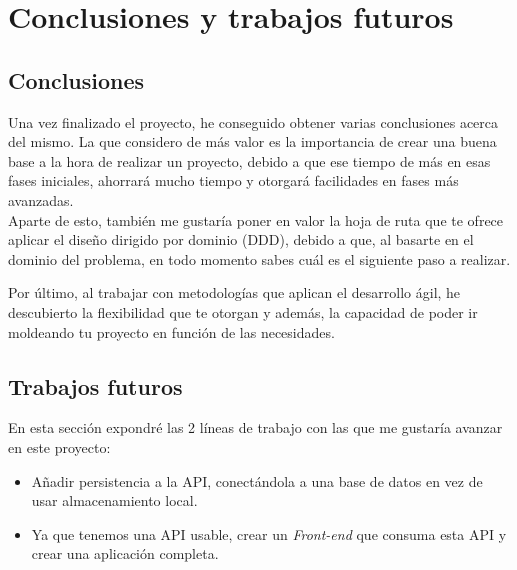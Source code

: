 \chapter{Conclusiones y trabajos futuros}

\section{Conclusiones}
Una vez finalizado el proyecto, he conseguido obtener varias conclusiones acerca del mismo.
La que considero de más valor es la importancia de crear una buena base a la hora de realizar un proyecto, debido a que ese tiempo de más 
en esas fases iniciales, ahorrará mucho tiempo y otorgará facilidades en fases más avanzadas.\\

Aparte de esto, también me gustaría poner en valor la hoja de ruta que te ofrece aplicar el diseño dirigido por dominio (DDD), debido a que,
al basarte en el dominio del problema, en todo momento sabes cuál es el siguiente paso a realizar.

Por último, al trabajar con metodologías que aplican el desarrollo ágil, he descubierto la flexibilidad que te otorgan y además, la capacidad de poder ir moldeando tu
proyecto en función de las necesidades.

\section{Trabajos futuros}

En esta sección expondré las 2 líneas de trabajo con las que me gustaría avanzar en este proyecto:

\begin{itemize}
    \item Añadir persistencia a la API, conectándola a una base de datos en vez de usar almacenamiento local.
    \item Ya que tenemos una API usable, crear un \textit{Front-end} que consuma esta API y crear una aplicación completa.
\end{itemize} 